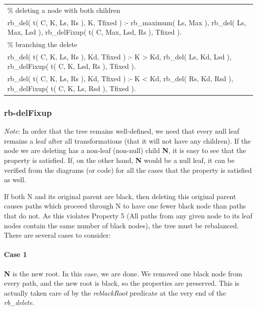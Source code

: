 \documentclass{article}
\newenvironment{code}{\obeycr\begin{it}\nopagebreak\addvspace{1ex}\noindent\footnotesize\begin{tabular}{|p{0.95\textwidth}|}\hline}{\\\hline\end{tabular}\par\addvspace{1ex}\end{it}\restorecr}
\newcommand{\inlinecode}[1]{\textit{#1}}
\begin{document}
\begin{code}
\% deleting a node with both children\\
rb\_del( t( C, K, Ls, Rs ), K, Tfixed ) :-
\hspace{2ex}rb\_maximum( Ls, Max ), 
\hspace{2ex}rb\_del( Ls, Max, Lsd ),
\hspace{2ex}rb\_delFixup( t( C, Max, Lsd, Rs ), Tfixed ).\\
\% branching the delete\\
rb\_del( t( C, K, Ls, Rs ), Kd, Tfixed ) :-
\hspace{2ex}K \textgreater{} Kd, 
\hspace{2ex}rb\_del( Ls, Kd, Lsd ),
\hspace{2ex}rb\_delFixup( t( C, K, Lsd, Rs ), Tfixed ).\\
rb\_del( t( C, K, Ls, Rs ), Kd, Tfixed ) :-
\hspace{2ex}K \textless{} Kd, 
\hspace{2ex}rb\_del( Rs, Kd, Rsd ),
\hspace{2ex}rb\_delFixup( t( C, K, Ls, Rsd ), Tfixed ).
\end{code}
  
\subsubsection{rb-delFixup}

\textit{Note}: In order that the tree remains well-defined, we need that every null leaf remains a leaf after all transformations (that it will not have any children). If the node we are deleting has a non-leaf (non-null) child \textbf{N}, it is easy to see that the property is satisfied. If, on the other hand, \textbf{N} would be a null leaf, it can be verified from the diagrams (or code) for all the cases that the property is satisfied as well.

If both N and its original parent are black, then deleting this original parent causes paths which proceed through N to have one fewer black node than paths that do not. As this violates Property 5 (All paths from any given node to its leaf nodes contain the same number of black nodes), the tree must be rebalanced. There are several cases to consider:

\pagebreak
\paragraph{Case 1}
\textbf{N} is the new root. In this case, we are done. We removed one black node from every path, and the new root is black, so the properties are preserved. This is actually taken care of by the \inlinecode{reblackRoot} predicate at the very end of the \inlinecode{rb\_delete}.
\end{document}
